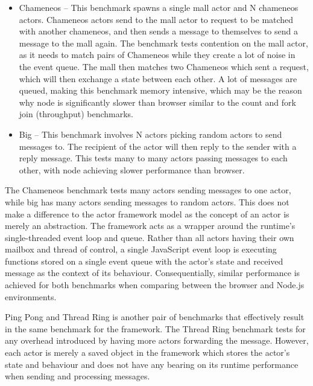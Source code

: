 \documentclass[oneside]{um-fict}
\begin{document}
\begin{itemize}
    \item Chameneos – This benchmark spawns a single mall actor and N chameneos actors. Chameneos actors send to the mall actor to request to be matched with another chameneos, and then sends a message to themselves to send a message to the mall again. The benchmark tests contention on the mall actor, as it needs to match pairs of Chameneos while they create a lot of noise in the event queue. The mall then matches two Chameneos which sent a request, which will then exchange a state between each other. A lot of messages are queued, making this benchmark memory intensive, which may be the reason why node is significantly slower than browser similar to the count and fork join (throughput) benchmarks.
    \item Big – This benchmark involves N actors picking random actors to send messages to. The recipient of the actor will then reply to the sender with a reply message. This tests many to many actors passing messages to each other, with node achieving slower performance than browser.
\end{itemize}
The Chameneos benchmark tests many actors sending messages to one actor, while big has many actors sending messages to random actors. This does not make a difference to the actor framework model as the concept of an actor is merely an abstraction. The framework acts as a wrapper around the runtime's single-threaded event loop and queue. Rather than all actors having their own mailbox and thread of control, a single JavaScript event loop is executing functions stored on a single event queue with the actor's state and received message as the context of its behaviour. Consequentially, similar performance is achieved for both benchmarks when comparing between the browser and Node.js environments.

Ping Pong and Thread Ring is another pair of benchmarks that effectively result in the same benchmark for the framework. The Thread Ring benchmark tests for any overhead introduced by having more actors forwarding the message. However, each actor is merely a saved object in the framework which stores the actor's state and behaviour and does not have any bearing on its runtime performance when sending and processing messages.
\end{document}
